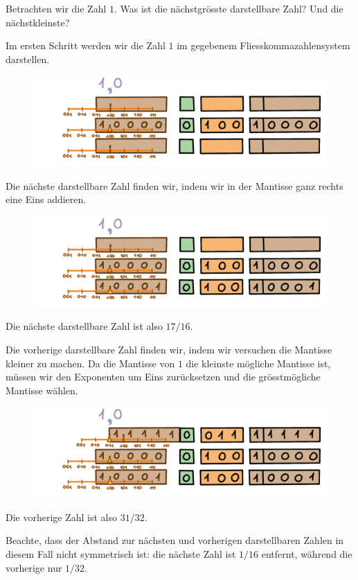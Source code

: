 \begin{beispiel}
Betrachten wir die Zahl \(1\). Was ist die nächstgrösste darstellbare Zahl? Und die nächstkleinste?

Im ersten Schritt werden wir die Zahl \(1\) im gegebenem Fliesskommazahlensystem darstellen.
\begin{figure}[H]
\centering
\includegraphics[width=\linewidth]{Pictures/Nachbarn1_1.png} 
\end{figure}

Die nächste darstellbare Zahl finden wir, indem wir in der Mantisse ganz rechts eine Eins addieren.

\begin{figure}[H]
\centering
\includegraphics[width=\linewidth]{Pictures/Nachbarn1_N.png} 
\end{figure}
Die nächste darstellbare Zahl ist also \(17/16\).

Die vorherige darstellbare Zahl finden wir, indem wir versuchen die Mantisse kleiner zu machen. Da die Mantisse von \(1\) die kleinste mögliche Mantisse ist, müssen wir den Exponenten um Eins zurücksetzen und die grösstmögliche Mantisse wählen.

\begin{figure}[H]
\centering
\includegraphics[width=\linewidth]{Pictures/Nachbarn1_P.png} 
\end{figure}
Die vorherige Zahl ist also \(31/32\).

Beachte, dass der Abstand zur nächsten und vorherigen darstellbaren Zahlen in diesem Fall nicht symmetrisch ist: die nächste Zahl ist \(1/16\) entfernt, während die vorherige nur \(1/32\).
\end{beispiel}

